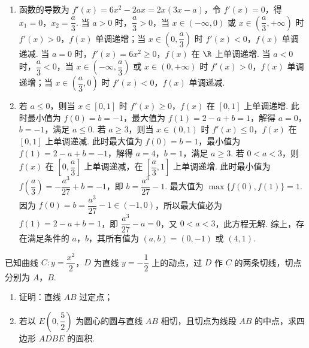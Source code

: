 \begin{solution}
\begin{enumerate}
\item 函数的导数为 \(f'(x)=6x^2-2ax=2x(3x-a)\)，令 \(f'(x)=0\)，得 \(x_1=0\)，\(x_2=\dfrac a3\).
当 \(a>0\) 时，\(\dfrac a3>0\)，当 \(x\in(-\infty,0)\) 或 \(x\in\left(\dfrac a3,+\infty\right)\) 时 \(f'(x)>0\)，\(f(x)\) 单调递增；当 \(x\in\left(0,\dfrac a3\right)\) 时 \(f'(x)<0\)，\(f(x)\) 单调递减.
当 \(a=0\) 时，\(f'(x)=6x^2\ge0\)，\(f(x)\) 在 \(\R\) 上单调递增.
当 \(a<0\) 时，\(\dfrac a3<0\)，当 \(x\in\left(-\infty,\dfrac a3\right)\) 或 \(x\in(0,+\infty)\) 时 \(f'(x)>0\)，\(f(x)\) 单调递增；当 \(x\in\left(\dfrac a3,0\right)\) 时 \(f'(x)<0\)，\(f(x)\) 单调递减.

\item 若 \(a\le0\)，则当 \(x\in[0,1]\) 时 \(f'(x)\ge0\)，\(f(x)\) 在 \([0,1]\) 上单调递增. 此时最小值为 \(f(0)=b=-1\)，最大值为 \(f(1)=2-a+b=1\)，解得 \(a=0\)，\(b=-1\)，满足 \(a\le0\).
若 \(a\ge3\)，则当 \(x\in(0,1)\) 时 \(f'(x)\le0\)，\(f(x)\) 在 \([0,1]\) 上单调递减. 此时最大值为 \(f(0)=b=1\)，最小值为 \(f(1)=2-a+b=-1\)，解得 \(a=4\)，\(b=1\)，满足 \(a\ge3\).
若 \(0<a<3\)，则 \(f(x)\) 在 \(\left[0,\dfrac a3\right]\) 上单调递减，在 \(\left[\dfrac a3,1\right]\) 上单调递增. 此时最小值为 \(f\left(\dfrac a3\right)=-\dfrac{a^3}{27}+b=-1\)，即 \(b=\dfrac{a^3}{27}-1\). 最大值为 \(\max\{f(0),f(1)\}=1\). 因为 \(f(0)=b=\dfrac{a^3}{27}-1\in(-1,0)\)，所以最大值必为 \(f(1)=2-a+b=1\)，即 \(\dfrac{a^3}{27}-a=0\)，又 \(0<a<3\)，此方程无解.
综上，存在满足条件的 \(a\)，\(b\)，其所有值为 \((a,b)=(0,-1)\) 或 \((4,1)\).
\end{enumerate}
\end{solution}

\begin{problem}
已知曲线 \(C:y=\dfrac{x^2}{2}\)，\(D\) 为直线 \(y=-\dfrac12\) 上的动点，过 \(D\) 作 \(C\) 的两条切线，切点分别为 \(A\)，\(B\).

\begin{enumerate}
\item 证明：直线 \(AB\) 过定点；
\item 若以 \(E(0,\dfrac52)\) 为圆心的圆与直线 \(AB\) 相切，且切点为线段 \(AB\) 的中点，求四边形 \(ADBE\) 的面积.
\end{enumerate}
\end{problem}

